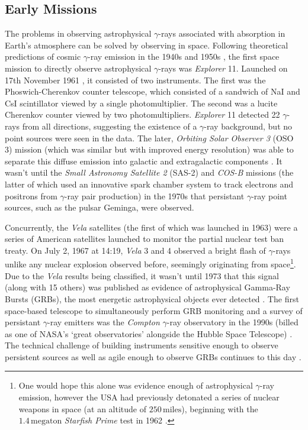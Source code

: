 \subsection{Early Missions}
\label{sec:earlymissions}
The problems in observing astrophysical $\gamma$-rays associated with absorption in Earth's atmosphere can be solved by observing in space. Following theoretical predictions of cosmic $\gamma$-ray emission in the 1940s and 1950s \cite{morrison}, the first space mission to directly observe astrophysical $\gamma$-rays was \textit{Explorer} 11. Launched on 17th November 1961 \cite{explorer}, it consisted of two instruments. The first was the Phoswich-Cherenkov counter telescope, which consisted of a sandwich of NaI and CsI scintillator viewed by a single photomultiplier. The second was a lucite Cherenkov counter viewed by two photomultipliers. \textit{Explorer} 11 detected 22 $\gamma$-rays from all directions, suggesting the existence of a $\gamma$-ray background, but no point sources were seen in the data. The later, \textit{Orbiting Solar Observer 3} (OSO 3) mission (which was similar but with improved energy resolution) was able to separate this diffuse emission into galactic and extragalactic components \cite{oso3}. It wasn't until the \textit{Small Astronomy Satellite 2} (SAS-2) \cite{sas2} and \textit{COS-B} \cite{cosb} missions (the latter of which used an innovative spark chamber system to track electrons and positrons from $\gamma$-ray pair production) in the 1970s that persistant $\gamma$-ray point sources, such as the pulsar Geminga, were observed.

Concurrently, the \textit{Vela} satellites (the first of which was launched in 1963) were a series of American satellites launched to monitor the partial nuclear test ban treaty. On July 2, 1967 at 14:19, \textit{Vela} 3 and 4 observed a bright flash of $\gamma$-rays unlike any nuclear explosion observed before, seemingly originating from space\footnote{One would hope this alone was evidence enough of astrophysical $\gamma$-ray emission, however the USA had previously detonated a series of nuclear weapons in space (at an altitude of $\mathrm{250\,miles}$), beginning with the $\mathrm{1.4\,megaton}$ \textit{Starfish Prime} test in 1962 \cite{starfish}.}. Due to the \textit{Vela} results being classified, it wasn't until 1973 that this signal (along with 15 others) was published as evidence of astrophysical Gamma-Ray Bursts (GRBs), the most energetic astrophysical objects ever detected \cite{velagrb}. The first space-based telescope to simultaneously perform GRB monitoring and a survey of persistant $\gamma$-ray emitters was the \textit{Compton} $\gamma$-ray observatory in the 1990s (billed as one of NASA's `great observatories' alongside the Hubble Space Telescope) \cite{compton}. The technical challenge of building instruments sensitive enough to observe persistent sources as well as agile enough to observe GRBs continues to this day \cite{magicGRB}.

